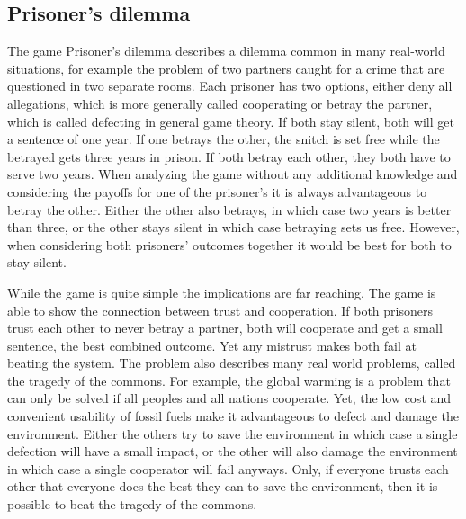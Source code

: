 \subsection{Prisoner's dilemma}
\label{sec:prisoner}
The game Prisoner's dilemma describes a dilemma common in many real-world situations, for
example the problem of two partners caught for a crime that are questioned in two separate rooms. 
Each prisoner has two options, either deny all allegations, which is more generally called cooperating
 or betray the partner, which is called defecting in general game theory. If both stay 
silent, both will get a sentence of one year. If one betrays the other, the snitch is set free while the 
betrayed gets three years in prison. If both betray each other, they both have to serve two years.
When analyzing the game without any additional knowledge and considering the payoffs for one of the
prisoner's it is always advantageous to betray the other. Either the other also betrays, in which case
two years is better than three, or the other stays silent in which case betraying sets us free. 
However, when considering both prisoners' outcomes together it would be best for both to stay silent.


While the game is quite simple the implications are far reaching. The game is able to show the 
connection between trust and cooperation. If both prisoners trust each other to never betray a 
partner, both will cooperate and get a small sentence, the best combined outcome. Yet any mistrust
makes both fail at beating the system. The problem also describes many real world problems, called 
the tragedy of the commons. For example, the global warming is a problem that can only be solved if
all peoples and all nations cooperate. Yet, the low cost and convenient usability of fossil fuels 
make it advantageous to defect and damage the environment. Either the others try to save the environment
in which case a single defection will have a small impact, or the other will also damage the environment
in which case a single cooperator will fail anyways. Only, if everyone trusts each other that
everyone does the best they can to save the environment, then it is possible to beat the tragedy 
of the commons.

